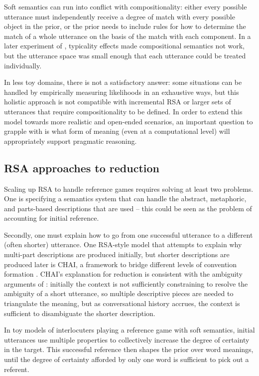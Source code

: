 \documentclass[]{article}
\begin{document}
Soft semantics can run into conflict with compositionality: either every possible utterance must independently receive a degree of match with every possible object in the prior, or the prior needs to include rules for how to determine the match of a whole utterance on the basis of the match with each component. In a later experiment of \citep{degen20200406}, typicality effects made compositional semantics not work, but the utterance space was small enough that each utterance could be treated individually. 

 In less toy domains, there is not a satisfactory answer: some situations can be handled by empirically measuring likelihoods in an exhaustive ways, but this holistic approach is not compatible with incremental RSA \citep{cohn-gordon2018a} or larger sets of utterances that require compositionality to be defined. In order to extend this model towards more realistic and open-ended scenarios, an important question to grapple with is what form of meaning (even at a computational level) will appropriately support pragmatic reasoning. 

\subsection{RSA approaches to reduction}
Scaling up RSA to handle reference games requires solving at least two problems. One is specifying a semantics system that can handle the abstract, metaphoric, and parts-based descriptions that are used -- this could be seen as the problem of accounting for initial reference. 

Secondly, one must explain how to go from one successful utterance to a different (often shorter) utterance. One RSA-style model that attempts to explain why multi-part descriptions are produced initially, but shorter descriptions are produced later is CHAI,  a framework to bridge different levels of convention formation \citep{hawkins2021}. %
CHAI's explanation for reduction is consistent with the ambiguity arguments of \citet{piantadosi2012}: initially the context is not sufficiently constraining to resolve the ambiguity of a short utterance, so multiple descriptive pieces are needed to triangulate the meaning, but as conversational history accrues, the context is sufficient to disambiguate the shorter description. 

In toy models of interlocuters playing a reference game with soft semantics, initial utterances use multiple properties to collectively increase the degree of certainty in the target. This successful reference then shapes the prior over word meanings, until the degree of certainty afforded by only one word is sufficient to pick out a referent. 
\end{document}

